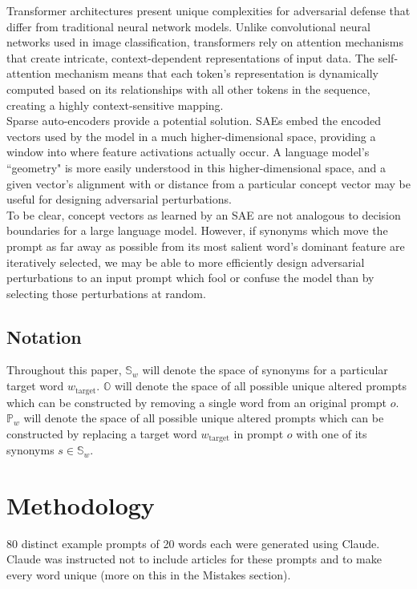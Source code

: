 \documentclass{article}
\begin{document}
Transformer architectures present unique complexities for adversarial defense that differ from traditional neural network models. Unlike convolutional neural networks used in image classification, transformers rely on attention mechanisms that create intricate, context-dependent representations of input data. The self-attention mechanism means that each token's representation is dynamically computed based on its relationships with all other tokens in the sequence, creating a highly context-sensitive mapping. \\

Sparse auto-encoders provide a potential solution. SAEs embed the encoded vectors used by the model in a much higher-dimensional space, providing a window into where feature activations actually occur. A language model's ``geometry" is more easily understood in this higher-dimensional space, and a given vector's alignment with or distance from a particular concept vector may be useful for designing adversarial perturbations.\\ 

To be clear, concept vectors as learned by an SAE are not analogous to decision boundaries for a large language model. However, if synonyms which move the prompt as far away as possible from its most salient word's dominant feature are iteratively selected, we may be able to more efficiently design adversarial perturbations to an input prompt which fool or confuse the model than by selecting those perturbations at random. 

\subsection*{Notation}

Throughout this paper, $\mathbb{S}_w$ will denote the space of synonyms for a particular target word $w_\text{target}$.  $\mathbb{O}$ will denote the space of all possible unique altered prompts which can be constructed by removing a single word from an original prompt $o$. $\mathbb{P}_w$ will denote the space of all possible unique altered prompts which can be constructed by replacing a target word $w_\text{target}$ in prompt $o$ with one of its synonyms $s \in \mathbb{S}_w$. 

\section*{Methodology}

80 distinct example prompts of 20 words each were generated using Claude. Claude was instructed not to include articles for these prompts and to make every word unique (more on this in the Mistakes section). \\
\end{document}
